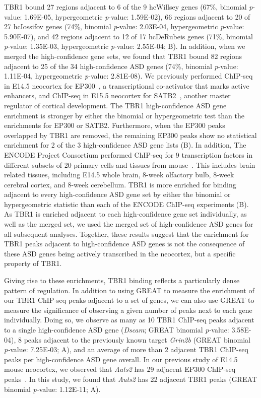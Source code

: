 TBR1 bound 27 regions adjacent to 6 of the 9 hcWillsey genes (67\%,
binomial \emph{p}-value: 1.69E-05, hypergeometric \emph{p}-value:
1.59E-02), 66 regions adjacent to 20 of 27 hcIossifov genes (74\%,
binomial \emph{p}-value: 2.03E-04, hypergeometric \emph{p}-value:
5.90E-07), and 42 regions adjacent to 12 of 17 hcDeRubeis genes (71\%,
binomial \emph{p}-value: 1.35E-03, hypergeometric \emph{p}-value:
2.55E-04; B). In addition, when we merged the high-confidence gene
sets, we found that TBR1 bound 82 regions adjacent to 25 of the 34
high-confidence ASD genes (74\%, binomial \emph{p}-value: 1.11E-04,
hypergeometric \emph{p}-value: 2.81E-08). We previously performed
ChIP-seq in E14.5 neocortex for EP300~\citep{Wenger:2013jd}, a
transcriptional co-activator that marks active enhancers, and ChIP-seq
in E15.5 neocortex for SATB2~\citep{McKenna:2015fv}, another master
regulator of cortical development. The TBR1 high-confidence ASD gene
enrichment is stronger by either the binomial or hypergeometric test
than the enrichments for EP300 or SATB2. Furthermore, when the EP300
peaks overlapped by TBR1 are removed, the remaining EP300 peaks show no
statistical enrichment for 2 of the 3 high-confidence ASD gene lists
(B). In addition, The ENCODE Project Consortium performed ChIP-seq
for 9 transcription factors in different subsets of 20 primary cells and
tissues from mouse~\citep{ENCODEProjectConsortium:2012gc}. This includes
brain related tissues, including E14.5 whole brain, 8-week olfactory
bulb, 8-week cerebral cortex, and 8-week cerebellum. TBR1 is more
enriched for binding adjacent to every high-confidence ASD gene set by
either the binomial or hypergeometric statistic than each of the ENCODE
ChIP-seq experiments (B). As TBR1 is
enriched adjacent to each high-confidence gene set individually, as well
as the merged set, we used the merged set of high-confidence ASD genes
for all subsequent analyses. Together, these results suggest that the
enrichment for TBR1 peaks adjacent to high-confidence ASD genes is not
the consequence of these ASD genes being actively transcribed in the
neocortex, but a specific property of TBR1.

Giving rise to these enrichments, TBR1 binding reflects a particularly
dense pattern of regulation. In addition to using GREAT to measure the
enrichment of our TBR1 ChIP-seq peaks adjacent to a set of genes, we can
also use GREAT to measure the significance of observing a given number
of peaks next to each gene individually. Doing so, we observe as many as
10 TBR1 ChIP-seq peaks adjacent to a single high-confidence ASD gene
(\emph{Dscam}; GREAT binomial \emph{p-}value: 3.58E-04), 8 peaks
adjacent to the previously known target \emph{Grin2b} (GREAT binomial
\emph{p-}value: 7.25E-03; A), and an average of more than 2
adjacent TBR1 ChIP-seq peaks per high-confidence ASD gene overall. In
our previous study of E14.5 mouse neocortex, we observed that
\emph{Auts2} has 29 adjacent EP300 ChIP-seq peaks~\citep{Wenger:2013jd}.
In this study, we found that \emph{Auts2} has 22 adjacent TBR1 peaks
(GREAT binomial \emph{p-}value: 1.12E-11; A).


